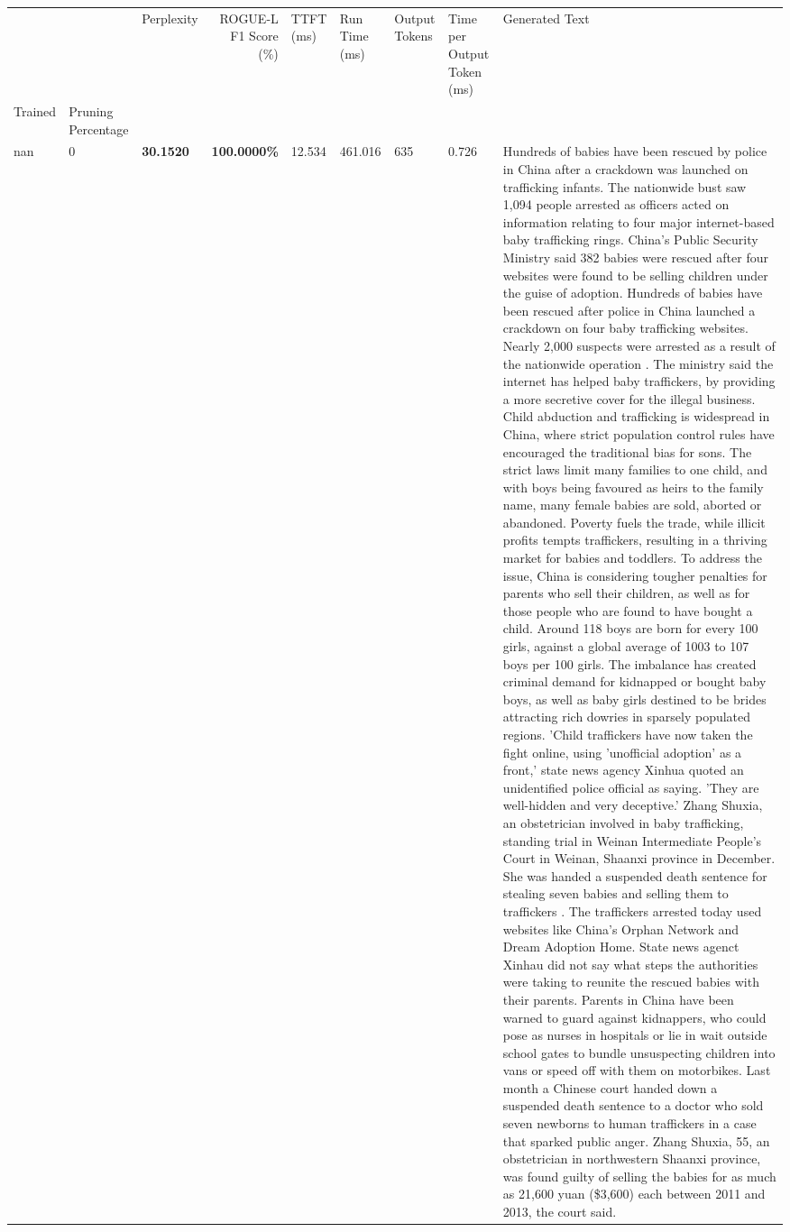 \begin{table}[H]
\label{tab:evaluation-pipeline-9}
\begin{tabular}{lllrlllll}
\toprule
 &  & Perplexity & ROGUE-L F1 Score (\%) & TTFT (ms) & Run Time (ms) & Output Tokens & Time per Output Token (ms) & Generated Text \\
Trained & Pruning Percentage &  &  &  &  &  &  &  \\
\midrule
nan & 0 & \bfseries 30.1520 & \bfseries 100.0000\% & 12.534 & 461.016 & 635 & 0.726 & Hundreds of babies have been rescued by police in China after a crackdown was launched on trafficking infants. The nationwide bust saw 1,094 people arrested as officers acted on information relating to four major internet-based baby trafficking rings. China's Public Security Ministry said 382 babies were rescued after four websites were found to be selling children under the guise of adoption. Hundreds of babies have been rescued after police in China launched a crackdown on four baby trafficking websites. Nearly 2,000 suspects were arrested as a result of the nationwide operation . The ministry said the internet has helped baby traffickers, by providing a more secretive cover for the illegal business. Child abduction and trafficking is widespread in China, where strict population control rules have encouraged the traditional bias for sons. The strict laws limit many families to one child, and with boys being favoured as heirs to the family name, many female babies are sold, aborted or abandoned. Poverty fuels the trade, while illicit profits tempts traffickers, resulting in a thriving market for babies and toddlers. To address the issue, China is considering tougher penalties for parents who sell their children, as well as for those people who are found to have bought a child. Around 118 boys are born for every 100 girls, against a global average of 1003 to 107 boys per 100 girls. The imbalance has created criminal demand for kidnapped or bought baby boys, as well as baby girls destined to be brides attracting rich dowries in sparsely populated regions. 'Child traffickers have now taken the fight online, using 'unofficial adoption' as a front,' state news agency Xinhua quoted an unidentified police official as saying. 'They are well-hidden and very deceptive.' Zhang Shuxia, an obstetrician involved in baby trafficking, standing trial in Weinan Intermediate People's Court in Weinan, Shaanxi province in December. She was handed a suspended death sentence for stealing seven babies and selling them to traffickers . The traffickers arrested today used websites like China's Orphan Network and Dream Adoption Home. State news agenct Xinhau did not say what steps the authorities were taking to reunite the rescued babies with their parents. Parents in China have been warned to guard against kidnappers, who could pose as nurses in hospitals or lie in wait outside school gates to bundle unsuspecting children into vans or speed off with them on motorbikes. Last month a Chinese court handed down a suspended death sentence to a doctor who sold seven newborns to human traffickers in a case that sparked public anger. Zhang Shuxia, 55, an obstetrician in northwestern Shaanxi province, was found guilty of selling the babies for as much as 21,600 yuan (\$3,600) each between 2011 and 2013, the court said. 
\end{tabular}
\end{table}
